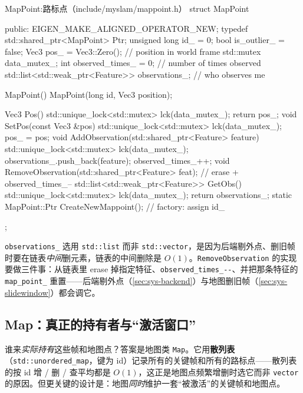 \begin{codebox}[C++]{MapPoint:路标点（include/myslam/mappoint.h）}
struct MapPoint {
   public:
    EIGEN_MAKE_ALIGNED_OPERATOR_NEW;
    typedef std::shared_ptr<MapPoint> Ptr;
    unsigned long id_ = 0;
    bool is_outlier_ = false;
    Vec3 pos_ = Vec3::Zero();          // position in world frame
    std::mutex data_mutex_;
    int observed_times_ = 0;           // number of times observed
    std::list<std::weak_ptr<Feature>> observations_;  // who observes me

    MapPoint() {}
    MapPoint(long id, Vec3 position);

    Vec3 Pos() {
        std::unique_lock<std::mutex> lck(data_mutex_);
        return pos_;
    }
    void SetPos(const Vec3 &pos) {
        std::unique_lock<std::mutex> lck(data_mutex_);
        pos_ = pos;
    }
    void AddObservation(std::shared_ptr<Feature> feature) {
        std::unique_lock<std::mutex> lck(data_mutex_);
        observations_.push_back(feature);
        observed_times_++;
    }
    void RemoveObservation(std::shared_ptr<Feature> feat);  // erase + observed_times_--
    std::list<std::weak_ptr<Feature>> GetObs() {
        std::unique_lock<std::mutex> lck(data_mutex_);
        return observations_;
    }
    static MapPoint::Ptr CreateNewMappoint();   // factory: assign id_
};
\end{codebox}

\noindent \texttt{observations\_} 选用 \texttt{std::list} 而非 \texttt{std::vector}，是因为后端剔外点、删旧帧时要在链表\emph{中间}删元素，链表的中间删除是 $O(1)$。\texttt{RemoveObservation} 的实现要做三件事：从链表里 erase 掉指定特征、\texttt{observed\_times\_-{}-}、并把那条特征的 \texttt{map\_point\_} 重置——后端剔外点（\cref{sec:sys-backend}）与地图删旧帧（\cref{sec:sys-slidewindow}）都会调它。

\subsection{Map：真正的持有者与“激活窗口”}
\label{sec:sys-map}

谁来\emph{实际持有}这些帧和地图点？答案是地图类 \texttt{Map}。它用\textbf{散列表}（\texttt{std::unordered\_map}，键为 id）记录所有的关键帧和所有的路标点——散列表的按 id 增 / 删 / 查平均都是 $O(1)$，这正是地图点频繁增删时选它而非 \texttt{vector} 的原因。但更关键的设计是：地图\emph{同时}维护一套“被激活”的关键帧和地图点。

